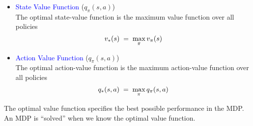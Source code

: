 \documentclass[landscape]{article}
\def\tcb{\textcolor{blue}}
\begin{document}
\newpage
\newvgtitle{\tcb{Optimal Value Function}}
\LARGE
\vspace{-.5em}
\vspace{0.5cm}
\begin{itemize}
    \huge
    \item \tcb{State Value Function} ($q_\pi(s,a)$)\\
    \LARGE
    The optimal state-value function is the maximum value function over all policies
    \begin{equation}\notag
    v_* (s)\;=\; \max\limits_{\pi} v_\pi (s)
    \end{equation}
    
    \huge
    \item \tcb{Action Value Function} ($q_\pi(s,a)$)\\
    \LARGE
    The optimal action-value function is the maximum action-value function over all policies 
    \begin{equation}\notag
    q_* (s,a)\;=\; \max\limits_{\pi} q_\pi (s,a)
    \end{equation}
\end{itemize}
\vspace{1.5cm}
The optimal value function specifies the best possible
performance in the MDP.\\
\vspace{1cm}
An MDP is “solved” when we know the optimal value function.
\vspace{0.5cm}
\end{document}
